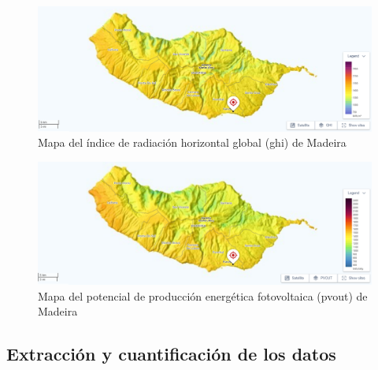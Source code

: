 \begin{figure}[H]
    \centering
    \includegraphics[width=1\textwidth]{img/diseno/madeiraghi.png}
    \caption{Mapa del índice de radiación horizontal global (\acrshort{ghi}) de Madeira \cite{globalsolar}}
    \label{fig:madeiraghi}
\end{figure}

\begin{figure}[H]
    \centering
    \includegraphics[width=1\textwidth]{img/diseno/madeirapvout.png}
    \caption{Mapa del potencial de producción energética fotovoltaica (\acrshort{pvout}) de Madeira \cite{globalsolar}}
    \label{fig:madeirapvout}
\end{figure}












 


\subsection{Extracción y cuantificación de los datos}


